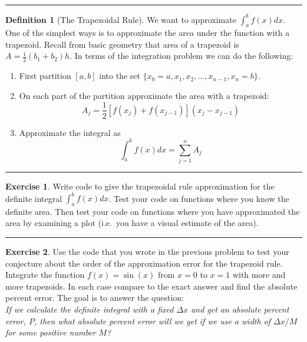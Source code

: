 \documentclass[
]{book}
\theoremstyle{definition}
\newtheorem{definition}{Definition}[chapter]
\theoremstyle{definition}
\theoremstyle{definition}
\newtheorem{exercise}{Exercise}[chapter]
\theoremstyle{remark}
\begin{document}
\begin{center}\rule{0.5\linewidth}{0.5pt}\end{center}

\begin{definition}[The Trapezoidal Rule]
\protect\hypertarget{def:trapezoidal}{}{\label{def:trapezoidal} {} }We want to approximate \(\displaystyle \int_a^b f(x) dx\). One of the
simplest ways is to approximate the area under the function with a
trapezoid. Recall from basic geometry that area of a trapezoid is
\(A = \frac{1}{2} (b_1 + b_2) h\). In terms of the integration problem we
can do the following:

\begin{enumerate}
\def\labelenumi{\alph{enumi}.}
\item
  First partition \([a,b]\) into the set
  \(\{x_0=a, x_1, x_2, \ldots, x_{n-1},  x_n=b\}\).
\item
  On each part of the partition approximate the area with a trapezoid:
  \[A_j = \frac{1}{2} \left[ f(x_j) + f(x_{j-1}) \right]\left(
              x_j - x_{j-1} \right)\]
\item
  Approximate the integral as \[\int_a^b f(x) dx = \sum_{j=1}^n A_j\]
\end{enumerate}
\end{definition}

\begin{center}\rule{0.5\linewidth}{0.5pt}\end{center}

\begin{exercise}
\protect\hypertarget{exr:unnamed-chunk-180}{}{\label{exr:unnamed-chunk-180} }Write code to give the trapezoidal rule approximation for the definite
integral \(\int_a^b f(x) dx\). Test your code on functions where you know
the definite area. Then test your code on functions where you have
approximated the area by examining a plot (i.e.~you have a visual
estimate of the area).
\end{exercise}

\begin{center}\rule{0.5\linewidth}{0.5pt}\end{center}

\begin{exercise}
\protect\hypertarget{exr:unnamed-chunk-181}{}{\label{exr:unnamed-chunk-181} }Use the code that you wrote in the previous problem to test your
conjecture about the order of the approximation error for the trapezoid
rule. Integrate the function \(f(x) = \sin(x)\) from \(x=0\) to \(x=1\) with more and more trapezoids. In
each case compare to the exact answer and find the absolute percent
error. The goal is to answer the question:\\
\emph{If we calculate the definite integral with a fixed \(\Delta x\) and get an
absolute percent error, \(P\), then what absolute percent error will we get
if we use a width of \(\Delta x / M\) for some positive number \(M\)?}
\end{exercise}
\end{document}
